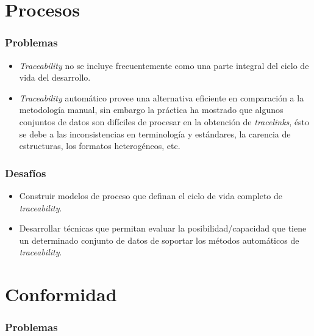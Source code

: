 \documentclass[a4paper,12pt,twoside,spanish,openright]{book}
\begin{document}
\section{Procesos}

\subsubsection{Problemas}

\begin{itemize}[label={$\times$}]

\item \textit{Traceability} no se incluye frecuentemente como una parte integral del ciclo de vida del desarrollo.

\item \textit{Traceability} automático provee una alternativa eficiente en comparación a la metodología manual, sin embargo la práctica ha mostrado que algunos conjuntos de datos  son difíciles de procesar en la obtención de \textit{tracelinks}, ésto se debe a las inconsistencias en terminología y estándares, la carencia de estructuras, los formatos heterogéneos, etc.

\end{itemize}

\subsubsection{Desafíos}

\begin{itemize}[label={\checkmark}]

\item Construir modelos de proceso que definan el ciclo de vida completo de \textit{traceability}.

\item Desarrollar técnicas que permitan evaluar la posibilidad/capacidad que tiene un determinado conjunto de datos de soportar los métodos automáticos de \textit{traceability}.
 
\end{itemize}

\section{Conformidad}

\subsubsection{Problemas}
\end{document}
